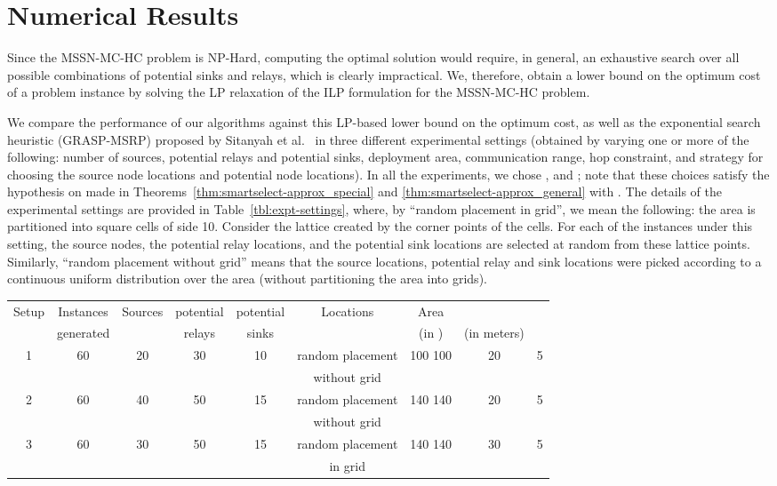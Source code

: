 \documentclass[conference]{IEEEtran}
\begin{document}
\section{Numerical Results} 
\label{sec:results}

Since the MSSN-MC-HC problem is NP-Hard, computing the optimal solution would require, in general, an exhaustive search over all possible combinations of potential sinks and relays, which is clearly impractical. We, therefore, obtain a lower bound on the optimum cost of a problem instance by solving the LP relaxation of the ILP formulation for the MSSN-MC-HC problem. 

We compare the performance of our algorithms against this LP-based lower bound on the optimum cost, as well as the exponential search heuristic (GRASP-MSRP) proposed by Sitanyah et al.\ \cite{sitanayah} in three different experimental settings (obtained by varying one or more of the following: number of sources, potential relays and potential sinks, deployment area, communication range, hop constraint, and strategy for choosing the source node locations and potential node locations). In all the experiments, we chose , and ; note that these choices satisfy the hypothesis on  made in Theorems~\ref{thm:smartselect-approx_special} and \ref{thm:smartselect-approx_general} with . The details of the experimental settings are provided in Table~\ref{tbl:expt-settings}, where, by ``random placement in grid'', we mean the following: the area is partitioned into square cells of side 10. Consider the lattice created by the corner points of the cells. For each of the instances under this setting, the source nodes, the potential relay locations, and the potential sink locations are selected at random from these lattice points. Similarly, ``random placement without grid'' means that the source locations, potential relay and sink locations were picked according to a continuous uniform distribution over the area (without partitioning the area into grids).

\begin{table*}[t]
  \centering
\caption{Details of the Experimental Settings}
\label{tbl:expt-settings}
\scriptsize
  \begin{tabular}{|c|c|c|c|c|c|c|c|c|}\hline
    Setup & Instances & Sources & potential & potential & Locations & Area &  & \\
    & generated & & relays & sinks & & (in ) & (in meters) & \\
    \hline
   1 & 60 & 20 & 30 & 10 & random placement & 100 100 & 20 & 5\\
     &    &    &    &    &  without grid    &               &    &   \\ 
  \hline
   2 & 60 & 40 & 50 & 15 & random placement & 140 140 & 20 & 5\\
     &    &    &    &    &  without grid    &                 &    &   \\
  \hline
   3 & 60& 30 & 50 & 15 & random placement & 140 140 & 30 & 5\\
     &    &    &    &    &  in grid         &                 &    &   \\
\hline
\end{tabular}
\normalsize
\end{table*}    
\end{document}
